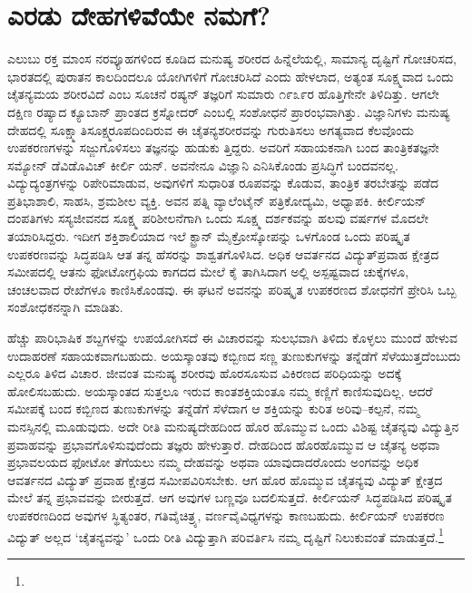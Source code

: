 \medskip


\section*{ಎರಡು ದೇಹಗಳಿವೆಯೇ ನಮಗೆ?}


ಎಲುಬು ರಕ್ತ ಮಾಂಸ ನರವ್ಯೂಹಗಳಿಂದ ಕೂಡಿದ ಮನುಷ್ಯ ಶರೀರದ ಹಿನ್ನೆಲೆಯಲ್ಲಿ, ಸಾಮಾನ್ಯ ದೃಷ್ಟಿಗೆ ಗೋಚರಿಸದ, ಭಾರತದಲ್ಲಿ ಪುರಾತನ ಕಾಲದಿಂದಲೂ ಯೋಗಿಗಳಿಗೆ ಗೋಚರಿಸಿದೆ ಎಂದು ಹೇಳಲಾದ, ಅತ್ಯಂತ ಸೂಕ್ಷ್ಮವಾದ ಒಂದು ಚೈತನ್ಯಮಯ ಶರೀರವಿದೆ ಎಂಬ ಸೂಚನೆ ರಷ್ಯನ್ ತಜ್ಞರಿಗೆ ಸುಮಾರು ೧೯೩೯ರ ಹೊತ್ತಿಗೇನೇ ತಿಳಿದಿತ್ತು. ಆಗಲೇ ದಕ್ಷಿಣ ರಷ್ಯಾದ ಕ್ಯೂಬಾನ್ ಪ್ರಾಂತದ ಕ್ರಸ್ನೋದರ್ ಎಂಬಲ್ಲಿ ಸಂಶೋಧನೆ ಪ್ರಾರಂಭವಾಗಿತ್ತು. ವಿಜ್ಞಾನಿಗಳು ಮನುಷ್ಯ ದೇಹದಲ್ಲಿ ಸೂಕ್ಷ್ಮಾತಿಸೂಕ್ಷ್ಮರೂಪದಿಂದಿರುವ ಈ ಚೈತನ್ಯಶರೀರವನ್ನು ಗುರುತಿಸಲು ಅಗತ್ಯವಾದ ಕೆಲವೊಂದು ಉಪಕರಣಗಳನ್ನು ಸಜ್ಜುಗೊಳಿಸಲು ತಜ್ಞನನ್ನು ಹುಡುಕು ತ್ತಿದ್ದರು. ಅವರಿಗೆ ಸಹಾಯಕನಾಗಿ ಬಂದ ತಾಂತ್ರಿಕತಜ್ಞನೇ ಸಮ್ಯೋನ್ ಡೆವಿಡೊವಿಚ್ ಕೀರ್ಲಿ ಯನ್. ಅವನೇನೂ ವಿಜ್ಞಾನಿ ಎನಿಸಿಕೊಂಡು ಪ್ರಸಿದ್ಧಿಗೆ ಬಂದವನಲ್ಲ. ವಿದ್ಯುದ್ಯಂತ್ರಗಳನ್ನು ರಿಪೇರಿಮಾಡುವ, ಅವುಗಳಿಗೆ ಸುಧಾರಿತ ರೂಪವನ್ನು ಕೊಡುವ, ತಾಂತ್ರಿಕ ತರಬೇತನ್ನು ಪಡೆದ ಪ್ರತಿಭಾಶಾಲಿ, ಸಾಹಸಿ, ಶ್ರಮಶೀಲ ವ್ಯಕ್ತಿ. ಅವನ ಪತ್ನಿ ವ್ಯಾಲೆಂಟೈನ್ ಪತ್ರಿಕೋದ್ಯಮಿ, ಅಧ್ಯಾಪಕಿ. ಕೀರ್ಲಿಯನ್ ದಂಪತಿಗಳು ಸಸ್ಯಜೀವನದ ಸೂಕ್ಷ್ಮ ಪರಿಶೀಲನೆಗಾಗಿ ಒಂದು ಸೂಕ್ಷ್ಮ ದರ್ಶಕವನ್ನು ಹಲವು ವರ್ಷಗಳ ಮೊದಲೇ ತಯಾರಿಸಿದ್ದರು. ಇದೀಗ ಶಕ್ತಿಶಾಲಿಯಾದ ಇಲೆ ಕ್ಟ್ರಾನ್ ಮೈಕ್ರೋಸ್ಕೋಪನ್ನು ಒಳಗೊಂಡ ಒಂದು ಪರಿಷ್ಕೃತ ಉಪಕರಣವನ್ನು ಸಿದ್ಧಪಡಿಸಿ ಆತ ತನ್ನ ಹೆಸರನ್ನು ಶಾಶ್ವತಗೊಳಿಸಿದ. ಅಧಿಕ ಆವರ್ತನದ ವಿದ್ಯುತ್​ಪ್ರವಾಹ ಕ್ಷೇತ್ರದ ಸಮೀಪದಲ್ಲಿ ಆತನು ಫೋಟೋಗ್ರಫಿಯ ಕಾಗದದ ಮೇಲೆ ಕೈ ತಾಗಿಸಿದಾಗ ಅಲ್ಲಿ ಅಸ್ಪಷ್ಟವಾದ ಚುಕ್ಕೆಗಳೂ, ಚಂಚಲವಾದ ರೇಖೆಗಳೂ ಕಾಣಿಸಿಕೊಂಡವು. ಈ ಘಟನೆ ಅವನನ್ನು ಪರಿಷ್ಕೃತ ಉಪಕರಣದ ಶೋಧನೆಗೆ ಪ್ರೇರಿಸಿ ಒಬ್ಬ ಸಂಶೋಧಕನನ್ನಾಗಿ ಮಾಡಿತು.

ಹೆಚ್ಚು ಪಾರಿಭಾಷಿಕ ಶಬ್ದಗಳನ್ನು ಉಪಯೋಗಿಸದೆ ಈ ವಿಚಾರವನ್ನು ಸುಲಭವಾಗಿ ತಿಳಿದು ಕೊಳ್ಳಲು ಮುಂದೆ ಹೇಳುವ ಉದಾಹರಣೆ ಸಹಾಯಕವಾಗಬಹುದು. ಅಯಸ್ಕಾಂತವು ಕಬ್ಬಿಣದ ಸಣ್ಣ ತುಣುಕುಗಳನ್ನು ತನ್ನೆಡೆಗೆ ಸೆಳೆಯುತ್ತದೆಂಬುದು ಎಲ್ಲರೂ ತಿಳಿದ ವಿಚಾರ. ಜೀವಂತ ಮನುಷ್ಯ ಶರೀರವು ಹೊರಸೂಸುವ ವಿಕಿರಣದ ಪರಿಧಿಯನ್ನು ಅದಕ್ಕೆ ಹೋಲಿಸಬಹುದು. ಅಯಸ್ಕಾಂತದ ಸುತ್ತಲೂ ಇರುವ ಕಾಂತಶಕ್ತಿಯಂತೂ ನಮ್ಮ ಕಣ್ಣಿಗೆ ಕಾಣಿಸುವುದಿಲ್ಲ. ಆದರೆ ಸಮೀಪಕ್ಕೆ ಬಂದ ಕಬ್ಬಿಣದ ತುಣುಕುಗಳನ್ನು ತನ್ನೆಡೆಗೆ ಸೆಳೆದಾಗ ಆ ಶಕ್ತಿಯನ್ನು ಕುರಿತ ಅರಿವು–ಕಲ್ಪನೆ, ನಮ್ಮ ಮನಸ್ಸಿನಲ್ಲಿ ಮೂಡುವುದು. ಅದೇ ರೀತಿ ಮನುಷ್ಯದೇಹದಿಂದ ಹೊರ ಹೊಮ್ಮುವ ಒಂದು ವಿಶಿಷ್ಟ ಚೈತನ್ಯವು ವಿದ್ಯುತ್ತಿನ ಪ್ರವಾಹವನ್ನು ಪ್ರಭಾವಗೊಳಿಸುವುದೆಂದು ತಜ್ಞರು ಹೇಳುತ್ತಾರೆ. ದೇಹದಿಂದ ಹೊರಹೊಮ್ಮುವ ಆ ಚೈತನ್ಯ ಅಥವಾ ಪ್ರಭಾವಲಯದ ಫೋಟೋ ತೆಗೆಯಲು ನಮ್ಮ ದೇಹವನ್ನು ಅಥವಾ ಯಾವುದಾದರೊಂದು ಅಂಗವನ್ನು ಅಧಿಕ ಆವರ್ತನದ ವಿದ್ಯುತ್ ಪ್ರವಾಹ ಕ್ಷೇತ್ರದ ಸಮೀಪವಿರಿಸಬೇಕು. ಆಗ ಹೊರ ಹೊಮ್ಮುವ ಚೈತನ್ಯವು ವಿದ್ಯುತ್ ಕ್ಷೇತ್ರದ ಮೇಲೆ ತನ್ನ ಪ್ರಭಾವವನ್ನು ಬೀರುತ್ತದೆ. ಆಗ ಅವುಗಳ ಬಣ್ಣವೂ ಬದಲಿಸುತ್ತದೆ. ಕೀರ್ಲಿಯನ್ ಸಿದ್ಧಪಡಿಸಿದ ಪರಿಷ್ಕೃತ ಉಪಕರಣದಿಂದ ಅವುಗಳ ಸ್ಥಿತ್ಯಂತರ, ಗತಿವೈಚಿತ್ರ್ಯ, ವರ್ಣವೈವಿಧ್ಯಗಳನ್ನು ಕಾಣಬಹುದು. ಕೀರ್ಲಿಯನ್ ಉಪಕರಣ ವಿದ್ಯುತ್ ಅಲ್ಲದ ‘ಚೈತನ್ಯವನ್ನು’ ಒಂದು ರೀತಿ ವಿದ್ಯುತ್ತಾಗಿ ಪರಿವರ್ತಿಸಿ ನಮ್ಮ ದೃಷ್ಟಿಗೆ ನಿಲುಕುವಂತೆ ಮಾಡುತ್ತದೆ.\footnote{}

